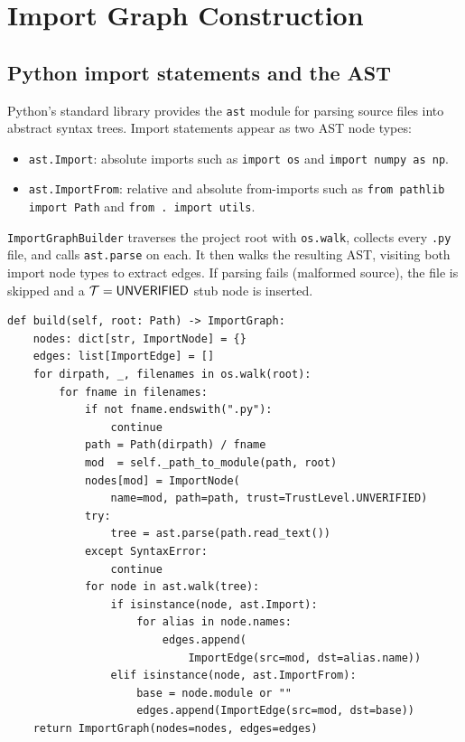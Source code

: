 \documentclass[11pt]{article}
\begin{document}
\section{Import Graph Construction}
\label{sec:construction}

\subsection{Python import statements and the AST}

Python's standard library provides the \texttt{ast} module for parsing
source files into abstract syntax trees.  Import statements appear as
two AST node types:
\begin{itemize}
  \item \texttt{ast.Import}: absolute imports such as
        \verb|import os| and \verb|import numpy as np|.
  \item \texttt{ast.ImportFrom}: relative and absolute from-imports
        such as \verb|from pathlib import Path| and
        \verb|from . import utils|.
\end{itemize}

\texttt{ImportGraphBuilder} traverses the project root with
\texttt{os.walk}, collects every \texttt{.py} file, and calls
\texttt{ast.parse} on each.  It then walks the resulting AST,
visiting both import node types to extract edges.  If parsing fails
(malformed source), the file is skipped and a
$\mathcal{T} = \mathsf{UNVERIFIED}$ stub node is inserted.

\begin{lstlisting}[style=jugeo-python,
  caption={Core of \texttt{ImportGraphBuilder.build}.},
  label={lst:build}]
def build(self, root: Path) -> ImportGraph:
    nodes: dict[str, ImportNode] = {}
    edges: list[ImportEdge] = []
    for dirpath, _, filenames in os.walk(root):
        for fname in filenames:
            if not fname.endswith(".py"):
                continue
            path = Path(dirpath) / fname
            mod  = self._path_to_module(path, root)
            nodes[mod] = ImportNode(
                name=mod, path=path, trust=TrustLevel.UNVERIFIED)
            try:
                tree = ast.parse(path.read_text())
            except SyntaxError:
                continue
            for node in ast.walk(tree):
                if isinstance(node, ast.Import):
                    for alias in node.names:
                        edges.append(
                            ImportEdge(src=mod, dst=alias.name))
                elif isinstance(node, ast.ImportFrom):
                    base = node.module or ""
                    edges.append(ImportEdge(src=mod, dst=base))
    return ImportGraph(nodes=nodes, edges=edges)
\end{lstlisting}
\end{document}
